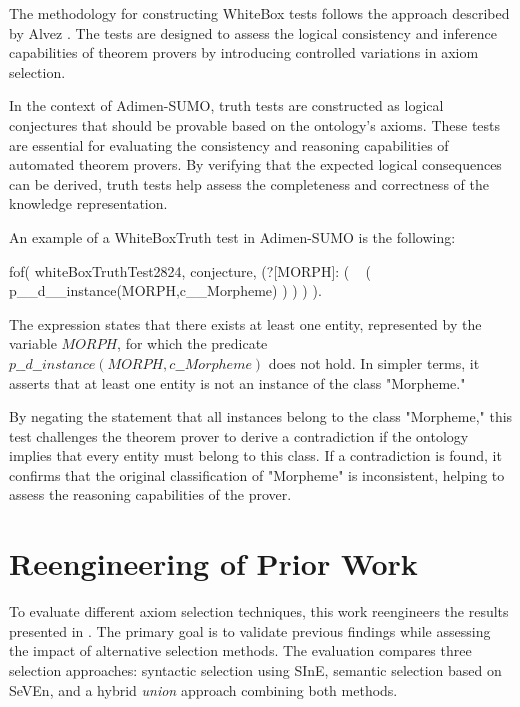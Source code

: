 \documentclass[english,version-2020-11]{uzl-thesis}
\begin{document}
The methodology for constructing WhiteBox tests follows the approach described by Alvez \cite{Alvez2017}. The tests are designed to assess the logical consistency and inference capabilities of theorem provers by introducing controlled variations in axiom selection.

In the context of Adimen-SUMO, truth tests are constructed as logical conjectures that should be provable based on the ontology's axioms. These tests are essential for evaluating the consistency and reasoning capabilities of automated theorem provers. By verifying that the expected logical consequences can be derived, truth tests help assess the completeness and correctness of the knowledge representation. 

An example of a WhiteBoxTruth test in Adimen-SUMO is the following:

\begin{Pseudocode}[morekeywords = {add, create}, deletekeywords={to}, numbers=left,
    caption = {WhiteboxTruthTest example}]
    fof( whiteBoxTruthTest2824, conjecture,
        (?[MORPH]: 
            (
                ~ (
                    p__d__instance(MORPH,c__Morpheme)
                )
            )
        )
    ).
\end{Pseudocode}


The expression states that there exists at least one entity, represented by the variable \( MORPH \), for which the predicate \( p\_\_d\_\_instance(MORPH, c\_\_Morpheme) \) does not hold. In simpler terms, it asserts that at least one entity is not an instance of the class "Morpheme."

By negating the statement that all instances belong to the class "Morpheme," this test challenges the theorem prover to derive a contradiction if the ontology implies that every entity must belong to this class. If a contradiction is found, it confirms that the original classification of "Morpheme" is inconsistent, helping to assess the reasoning capabilities of the prover.

\section{Reengineering of Prior Work}

To evaluate different axiom selection techniques, this work reengineers the results presented in \cite{Schon2024}. The primary goal is to validate previous findings while assessing the impact of alternative selection methods. The evaluation compares three selection approaches: syntactic selection using SInE, semantic selection based on SeVEn, and a hybrid \textit{union} approach combining both methods.
\end{document}
